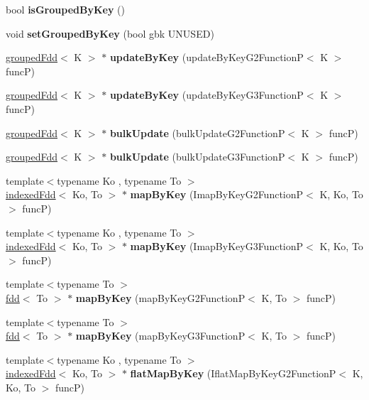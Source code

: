 \begin{DoxyCompactItemize}
\hypertarget{classfaster_1_1groupedFdd_ad1ed9e32f977574a9e0a12396e6578aa}{}\label{classfaster_1_1groupedFdd_ad1ed9e32f977574a9e0a12396e6578aa} 
bool {\bfseries is\+Grouped\+By\+Key} ()
\item 
\hypertarget{classfaster_1_1groupedFdd_a9228818350b8ff2fdbeba48f06d57e00}{}\label{classfaster_1_1groupedFdd_a9228818350b8ff2fdbeba48f06d57e00} 
void {\bfseries set\+Grouped\+By\+Key} (bool gbk U\+N\+U\+S\+ED)
\item 
\hyperlink{classfaster_1_1groupedFdd}{grouped\+Fdd}$<$ K $>$ $\ast$ {\bfseries update\+By\+Key} (update\+By\+Key\+G2\+FunctionP$<$ K $>$ funcP)
\item 
\hyperlink{classfaster_1_1groupedFdd}{grouped\+Fdd}$<$ K $>$ $\ast$ {\bfseries update\+By\+Key} (update\+By\+Key\+G3\+FunctionP$<$ K $>$ funcP)
\item 
\hyperlink{classfaster_1_1groupedFdd}{grouped\+Fdd}$<$ K $>$ $\ast$ {\bfseries bulk\+Update} (bulk\+Update\+G2\+FunctionP$<$ K $>$ funcP)
\item 
\hyperlink{classfaster_1_1groupedFdd}{grouped\+Fdd}$<$ K $>$ $\ast$ {\bfseries bulk\+Update} (bulk\+Update\+G3\+FunctionP$<$ K $>$ funcP)
\item 
{\footnotesize template$<$typename Ko , typename To $>$ }\\\hyperlink{classfaster_1_1indexedFdd}{indexed\+Fdd}$<$ Ko, To $>$ $\ast$ {\bfseries map\+By\+Key} (Imap\+By\+Key\+G2\+FunctionP$<$ K, Ko, To $>$ funcP)
\item 
{\footnotesize template$<$typename Ko , typename To $>$ }\\\hyperlink{classfaster_1_1indexedFdd}{indexed\+Fdd}$<$ Ko, To $>$ $\ast$ {\bfseries map\+By\+Key} (Imap\+By\+Key\+G3\+FunctionP$<$ K, Ko, To $>$ funcP)
\item 
{\footnotesize template$<$typename To $>$ }\\\hyperlink{classfaster_1_1fdd}{fdd}$<$ To $>$ $\ast$ {\bfseries map\+By\+Key} (map\+By\+Key\+G2\+FunctionP$<$ K, To $>$ funcP)
\item 
{\footnotesize template$<$typename To $>$ }\\\hyperlink{classfaster_1_1fdd}{fdd}$<$ To $>$ $\ast$ {\bfseries map\+By\+Key} (map\+By\+Key\+G3\+FunctionP$<$ K, To $>$ funcP)
\item 
{\footnotesize template$<$typename Ko , typename To $>$ }\\\hyperlink{classfaster_1_1indexedFdd}{indexed\+Fdd}$<$ Ko, To $>$ $\ast$ {\bfseries flat\+Map\+By\+Key} (Iflat\+Map\+By\+Key\+G2\+FunctionP$<$ K, Ko, To $>$ funcP)

\end{DoxyCompactItemize}
